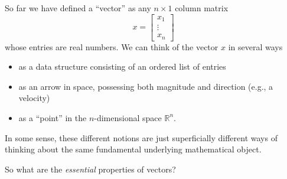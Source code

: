 \documentclass[10pt]{article}
\theoremstyle{definition}
\newcommand{\R}{\mathbb{R}}           %
\begin{document}
So far we have defined
a ``vector'' as any $n\times 1$ column matrix
\begin{equation*}
  x=\begin{bmatrix}
    x_{1}\\\vdots\\x_{n}
  \end{bmatrix}
\end{equation*}
whose entries are real numbers. We can think of the vector $x$ in several ways
\begin{itemize}
  \item as a data structure consisting of an ordered list of entries
  \item as an arrow in space, possessing both magnitude and direction (e.g., a
  velocity)
  \item as a ``point'' in the $n$-dimensional space $\R^{n}$.
\end{itemize}
In some sense, these different notions are just superficially different ways
of thinking about the same fundamental underlying mathematical object.

So what are the \textit{essential} properties of vectors?
\end{document}
